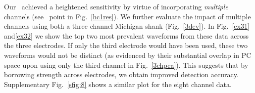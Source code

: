 Our \smug\ achieved a heightened sensitivity by virtue of incorporating \emph{multiple} channels (see \smug\ point in Fig.\ \ref{hc1res}).  
We further evaluate the impact of multiple channels using both a three channel Michigan shank (Fig.\ \ref{3dev}). In Fig.\ \ref{ex31} and\ref{ex32} we show the top two most prevalent waveforms from these data across the three electrodes.  If only the third electrode would have been used, these two waveforms would not be distinct (as evidenced by their substantial overlap in PC space upon using only the third channel in Fig.\ \ref{3chpca}).  This suggests that by borrowing strength across electrodes, we obtain improved detection accuracy. Supplementary Fig.\ \ref{sfig:8} shows a similar plot for the eight channel data.  







